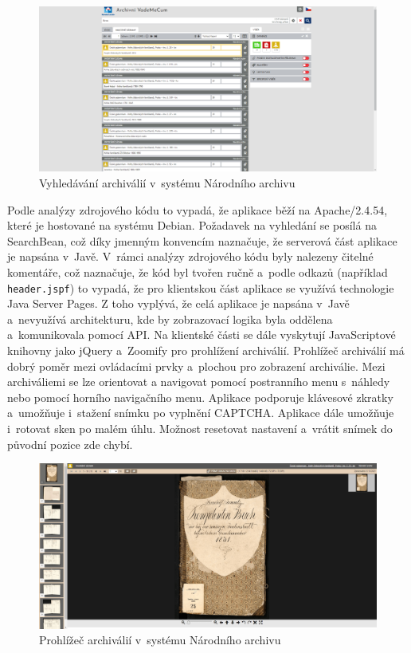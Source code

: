 \begin{figure}[htbp]
\centering
    \includegraphics[scale=.2]{obrazky-figures/archives/hpPraha/vyhledani.png}
    \caption{Vyhledávání archiválií v~systému Národního archivu}
\end{figure}
\noindent
Podle analýzy zdrojového kódu to vypadá, že aplikace běží na Apache/2.4.54, které je hostované na systému Debian. Požadavek na vyhledání se posílá na SearchBean, což díky jmenným konvencím naznačuje, že serverová část aplikace je napsána v~Javě. V~rámci analýzy zdrojového kódu byly nalezeny čitelné komentáře, což naznačuje, že kód byl tvořen ručně a~podle odkazů (například \texttt{header.jspf}) to vypadá, že pro klientskou část aplikace se využívá technologie Java Server Pages. Z toho vyplývá, že celá aplikace je napsána v~Javě a~nevyužívá architekturu, kde by zobrazovací logika byla oddělena a~komunikovala pomocí API. Na klientské části se dále vyskytují JavaScriptové knihovny jako jQuery a~Zoomify pro prohlížení archiválií.
\newpara
Prohlížeč archiválií má dobrý poměr mezi ovládacími prvky a~plochou pro zobrazení archiválie. Mezi archiváliemi se lze orientovat a navigovat pomocí postranního menu s~náhledy nebo pomocí horního navigačního menu. Aplikace podporuje klávesové zkratky a~umožňuje i~stažení snímku po vyplnění CAPTCHA. Aplikace dále umožňuje i~rotovat sken po  malém úhlu. Možnost resetovat nastavení a~vrátit snímek do původní pozice zde chybí.

\begin{figure}[htbp]
\centering
    \includegraphics[scale=.2]{obrazky-figures/archives/hpPraha/prohlizec.png}
    \caption{Prohlížeč archiválií v~systému Národního archivu}
\end{figure}

